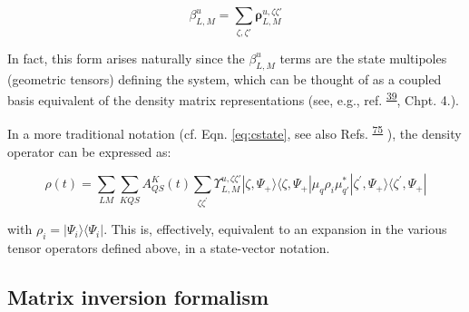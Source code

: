 \documentclass[10pt]{article}
\begin{document}
\begin{equation}
\beta_{L,M}^{u}=\sum_{\zeta,\zeta'}\mathbf{\rho}_{L,M}^{u,\zeta\zeta'}
\end{equation}

In fact, this form arises naturally since the $\beta_{L,M}^{u}$ terms are the state multipoles (geometric tensors) defining the system, which can be thought of as a coupled basis equivalent of the density matrix representations (see, e.g., ref. \textsuperscript{\hyperref[csl:39]{39}}, Chpt. 4.).

In a more traditional notation (cf. Eqn. \ref{eq:cstate}, see also Refs. \textsuperscript{\hyperref[csl:75]{75}} 
), the density operator can be expressed as:



\begin{equation}
\rho(t) =\sum_{LM}\sum_{KQS}A^{K}_{QS}(t)\sum_{\zeta\zeta^{\prime}}\varUpsilon_{L,M}^{u,\zeta\zeta'}|\zeta,\Psi_+\rangle\langle\zeta,\Psi_+|\mu_q\rho_i\mu_{q\prime}^{*}|\zeta^{\prime},\Psi_+\rangle\langle\zeta^{\prime},\Psi_+|
\end{equation}


with $\rho_i = |\Psi_i\rangle\langle\Psi_i|$. This is, effectively, equivalent to an expansion in the various tensor operators defined above, in a state-vector notation.




\subsection{Matrix inversion formalism\label{app:mat-inversion}}
\end{document}
